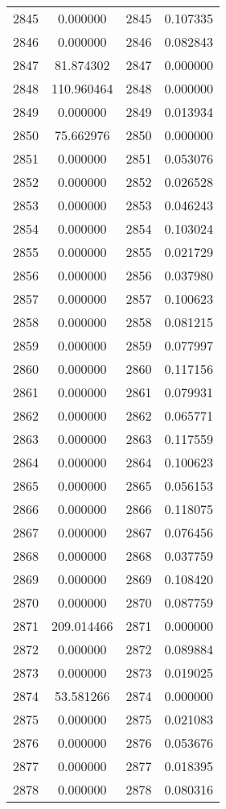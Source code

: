 \documentclass[12pt]{article}
\begin{document}
\begin{longtable}{@{}cccc@{}}
2845 & 0.000000 & 2845 & 0.107335 \\
2846 & 0.000000 & 2846 & 0.082843 \\
2847 & 81.874302 & 2847 & 0.000000 \\
2848 & 110.960464 & 2848 & 0.000000 \\
2849 & 0.000000 & 2849 & 0.013934 \\
2850 & 75.662976 & 2850 & 0.000000 \\
2851 & 0.000000 & 2851 & 0.053076 \\
2852 & 0.000000 & 2852 & 0.026528 \\
2853 & 0.000000 & 2853 & 0.046243 \\
2854 & 0.000000 & 2854 & 0.103024 \\
2855 & 0.000000 & 2855 & 0.021729 \\
2856 & 0.000000 & 2856 & 0.037980 \\
2857 & 0.000000 & 2857 & 0.100623 \\
2858 & 0.000000 & 2858 & 0.081215 \\
2859 & 0.000000 & 2859 & 0.077997 \\
2860 & 0.000000 & 2860 & 0.117156 \\
2861 & 0.000000 & 2861 & 0.079931 \\
2862 & 0.000000 & 2862 & 0.065771 \\
2863 & 0.000000 & 2863 & 0.117559 \\
2864 & 0.000000 & 2864 & 0.100623 \\
2865 & 0.000000 & 2865 & 0.056153 \\
2866 & 0.000000 & 2866 & 0.118075 \\
2867 & 0.000000 & 2867 & 0.076456 \\
2868 & 0.000000 & 2868 & 0.037759 \\
2869 & 0.000000 & 2869 & 0.108420 \\
2870 & 0.000000 & 2870 & 0.087759 \\
2871 & 209.014466 & 2871 & 0.000000 \\
2872 & 0.000000 & 2872 & 0.089884 \\
2873 & 0.000000 & 2873 & 0.019025 \\
2874 & 53.581266 & 2874 & 0.000000 \\
2875 & 0.000000 & 2875 & 0.021083 \\
2876 & 0.000000 & 2876 & 0.053676 \\
2877 & 0.000000 & 2877 & 0.018395 \\
2878 & 0.000000 & 2878 & 0.080316 \\

\end{longtable}
\end{document}
